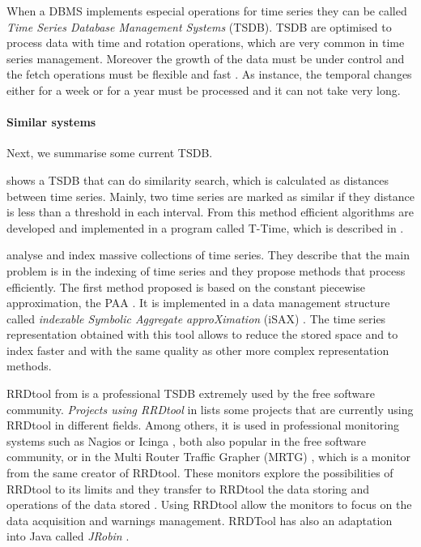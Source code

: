When a DBMS implements especial operations for time series they can be called \emph{Time Series Database Management Systems} (TSDB). TSDB are optimised to process data with time and rotation operations, which are very common in time series management. Moreover the growth of the data must be under control and the fetch operations must be flexible and fast \parencite{keogh10:isax}. As instance, the temporal changes either for a week or for a year must be processed and it can not take very long.

\paragraph{Similar systems} Next, we summarise some current TSDB.

\textcite{assfalg08:thesis} shows a TSDB that can do similarity search, which is calculated as distances between time series. Mainly, two time series are marked as similar if they distance is less than a threshold in each interval. From this method efficient algorithms are developed and implemented in a program called T-Time, which is described in \cite{assfalg08:ttime}.

 
\textcite{keogh08:isax,keogh10:isax} analyse and index massive collections of time series. They describe that the main problem is in the indexing of time series and they propose methods that process efficiently. The first method proposed is based on the constant piecewise approximation, the PAA \parencite{keogh00}. It is implemented in a data management structure called \emph{indexable Symbolic Aggregate approXimation} (iSAX) \parencite{isax}. The time series representation obtained with this tool allows to reduce the stored space and to index faster and with the same quality as other more complex representation methods.
 






RRDtool from \textcite{rrdtool} is a professional TSDB extremely used by the free software community. \emph{Projects using RRDtool} in \cite{rrdtool} lists some projects that are currently using RRDtool in different fields. Among others, it is used in professional monitoring systems such as Nagios \parencite{nagios} or Icinga \parencite{icinga}, both also popular in the free software community, or  in the Multi Router Traffic Grapher (MRTG) \parencite{mrtg}, which is a monitor from the same creator of RRDtool. 
These monitors explore the possibilities of RRDtool to its limits and they transfer to RRDtool the data storing and operations of the data stored . 
Using RRDtool allow the monitors to focus on the data acquisition and warnings management. RRDTool has also an adaptation into Java called \emph{JRobin} \parencite{jrobin}.



